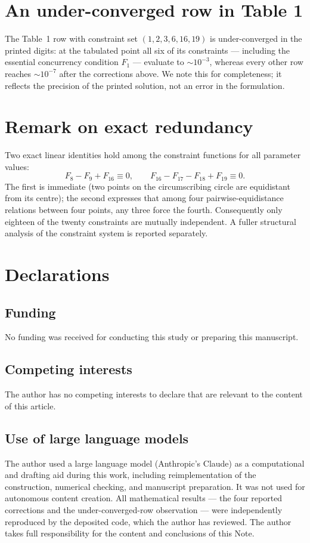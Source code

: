 \documentclass[11pt]{article}
\begin{document}
\section{An under-converged row in Table 1}
The Table~1 row with constraint set $(1,2,3,6,16,19)$ is under-converged in the printed digits: at the tabulated point all six of its constraints --- including the essential concurrency condition $F_1$ --- evaluate to ${\sim}10^{-3}$, whereas every other row reaches ${\sim}10^{-7}$ after the corrections above. We note this for completeness; it reflects the precision of the printed solution, not an error in the formulation.

\section{Remark on exact redundancy}
Two exact linear identities hold among the constraint functions for all parameter values:
\[ F_8 - F_9 + F_{16} \equiv 0, \qquad
   F_{16} - F_{17} - F_{18} + F_{19} \equiv 0. \]
The first is immediate (two points on the circumscribing circle are equidistant from its centre); the second expresses that among four pairwise-equidistance relations between four points, any three force the fourth. Consequently only eighteen of the twenty constraints are mutually independent. A fuller structural analysis of the constraint system is reported separately.

\section*{Declarations}

\subsection*{Funding}
No funding was received for conducting this study or preparing this manuscript.

\subsection*{Competing interests}
The author has no competing interests to declare that are relevant to the content of this article.

\subsection*{Use of large language models}
The author used a large language model (Anthropic's Claude) as a computational and drafting aid during this work, including reimplementation of the construction, numerical checking, and manuscript preparation. It was not used for autonomous content creation. All mathematical results — the four reported corrections and the under-converged-row observation — were independently reproduced by the deposited code, which the author has reviewed. The author takes full responsibility for the content and conclusions of this Note.
\end{document}
